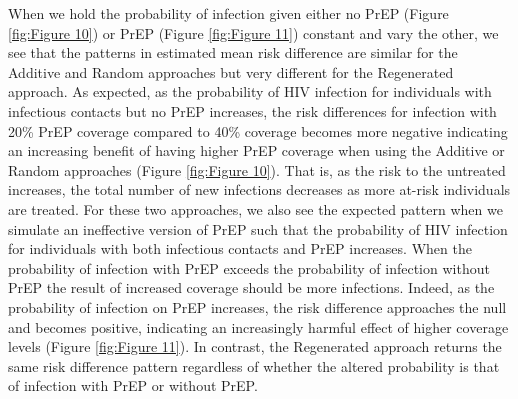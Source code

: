 \documentclass{article}
\theoremstyle{definition}
\begin{document}
When we hold the probability of infection given either no PrEP (Figure \ref{fig:Figure 10}) or PrEP (Figure \ref{fig:Figure 11}) constant and vary the other, we see that the patterns in estimated mean risk difference are similar for the Additive and Random approaches but very different for the Regenerated approach. As expected, as the probability of HIV infection for individuals with infectious contacts but no PrEP increases, the risk differences for infection with 20\% PrEP coverage compared to 40\% coverage becomes more negative indicating an increasing benefit of having higher PrEP coverage when using the Additive or Random approaches (Figure \ref{fig:Figure 10}). That is, as the risk to the untreated increases, the total number of new infections decreases as more at-risk individuals are treated. For these two approaches, we also see the expected pattern when we simulate an ineffective version of PrEP such that the probability of HIV infection for individuals with both infectious contacts and PrEP increases. When the probability of infection with PrEP exceeds the probability of infection without PrEP the result of increased coverage should be more infections. Indeed, as the probability of infection on PrEP increases, the risk difference approaches the null and becomes positive, indicating an increasingly harmful effect of higher coverage levels (Figure \ref{fig:Figure 11}). In contrast, the Regenerated approach returns the same risk difference pattern regardless of whether the altered probability is that of infection with PrEP or without PrEP.
\end{document}
